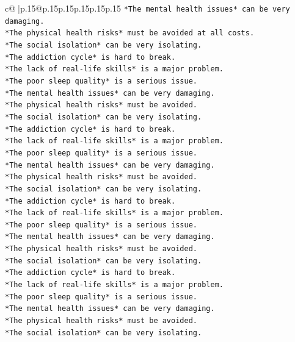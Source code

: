 \documentclass{article}
\begin{document}
{\begin{supertabular}{c@{$\;$}|p{.15\linewidth}@{}p{.15\linewidth}p{.15\linewidth}p{.15\linewidth}p{.15\linewidth}p{.15\linewidth}}
{{{\texttt{*The mental health issues* can be very damaging.} \\
\texttt{*The physical health risks* must be avoided at all costs.} \\
\texttt{*The social isolation* can be very isolating.} \\
\texttt{*The addiction cycle* is hard to break.} \\
\texttt{*The lack of real{-}life skills* is a major problem.} \\
\texttt{*The poor sleep quality* is a serious issue.} \\
\texttt{*The mental health issues* can be very damaging.} \\
\texttt{*The physical health risks* must be avoided.} \\
\texttt{*The social isolation* can be very isolating.} \\
\texttt{*The addiction cycle* is hard to break.} \\
\texttt{*The lack of real{-}life skills* is a major problem.} \\
\texttt{*The poor sleep quality* is a serious issue.} \\
\texttt{*The mental health issues* can be very damaging.} \\
\texttt{*The physical health risks* must be avoided.} \\
\texttt{*The social isolation* can be very isolating.} \\
\texttt{*The addiction cycle* is hard to break.} \\
\texttt{*The lack of real{-}life skills* is a major problem.} \\
\texttt{*The poor sleep quality* is a serious issue.} \\
\texttt{*The mental health issues* can be very damaging.} \\
\texttt{*The physical health risks* must be avoided.} \\
\texttt{*The social isolation* can be very isolating.} \\
\texttt{*The addiction cycle* is hard to break.} \\
\texttt{*The lack of real{-}life skills* is a major problem.} \\
\texttt{*The poor sleep quality* is a serious issue.} \\
\texttt{*The mental health issues* can be very damaging.} \\
\texttt{*The physical health risks* must be avoided.} \\
\texttt{*The social isolation* can be very isolating.} \\
}}}
\end{supertabular}}
\end{document}
